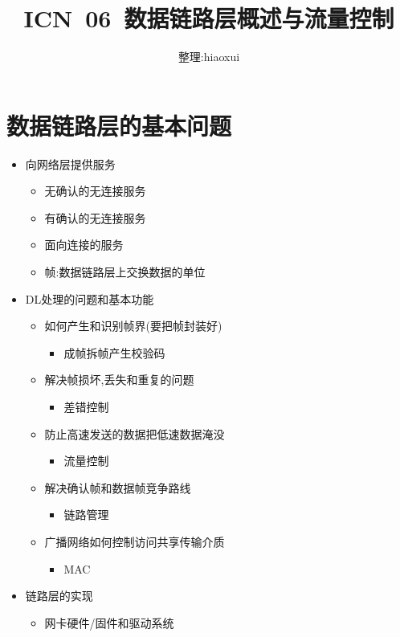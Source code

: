\documentclass[a4paper,12pt,notitlepage]{article}
\begin{document}
\title{ICN\ 06\ 数据链路层概述与流量控制}
\author{整理:hiaoxui}
\maketitle

\section{数据链路层的基本问题}

\begin{itemize}
	\item 向网络层提供服务
	\begin{itemize}
		\item 无确认的无连接服务
		\item 有确认的无连接服务
		\item 面向连接的服务
		\item 帧:数据链路层上交换数据的单位
	\end{itemize}
	\item DL处理的问题和基本功能
	\begin{itemize}
		\item 如何产生和识别帧界(要把帧封装好)
		\begin{itemize}
			\item 成帧拆帧产生校验码
		\end{itemize}
		\item 解决帧损坏,丢失和重复的问题
		\begin{itemize}
			\item 差错控制
		\end{itemize}
		\item 防止高速发送的数据把低速数据淹没
		\begin{itemize}
			\item 流量控制
		\end{itemize}
		\item 解决确认帧和数据帧竞争路线
		\begin{itemize}
			\item 链路管理
		\end{itemize}
		\item 广播网络如何控制访问共享传输介质
		\begin{itemize}
			\item MAC
		\end{itemize}
	\end{itemize}
	\item 链路层的实现
	\begin{itemize}
		\item 网卡硬件/固件和驱动系统

\end{itemize}
\end{itemize}
\end{document}
